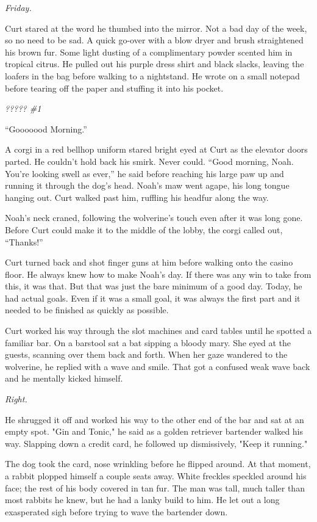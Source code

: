 \emph{Friday.}

Curt stared at the word he thumbed into the mirror. Not a bad day of the week, so no need to be sad. A quick go-over with a blow dryer and brush straightened his brown fur. Some light dusting of a complimentary powder scented him in tropical citrus. He pulled out his purple dress shirt and black slacks, leaving the loafers in the bag before walking to a nightstand. He wrote on a small notepad before tearing off the paper and stuffing it into his pocket.

\emph{????? \#1}

``Gooooood Morning.''

A corgi in a red bellhop uniform stared bright eyed at Curt as the elevator doors parted. He couldn't hold back his smirk. Never could. ``Good morning, Noah. You're looking swell as ever,'' he said before reaching his large paw up and running it through the dog's head. Noah's maw went agape, his long tongue hanging out. Curt walked past him, ruffling his headfur along the way.

Noah's neck craned, following the wolverine's touch even after it was long gone. Before Curt could make it to the middle of the lobby, the corgi called out, ``Thanks!''

Curt turned back and shot finger guns at him before walking onto the casino floor. He always knew how to make Noah's day. If there was any win to take from this, it was that. But that was just the bare minimum of a good day. Today, he had actual goals. Even if it was a small goal, it was always the first part and it needed to be finished as quickly as possible.

Curt worked his way through the slot machines and card tables until he spotted a familiar bar. On a barstool sat a bat sipping a bloody mary. She eyed at the guests, scanning over them back and forth. When her gaze wandered to the wolverine, he replied with a wave and smile. That got a confused weak wave back and he mentally kicked himself.

\emph{Right.}

He shrugged it off and worked his way to the other end of the bar and sat at an empty spot. "Gin and Tonic," he said as a golden retriever bartender walked his way. Slapping down a credit card, he followed up dismissively, "Keep it running."

The dog took the card, nose wrinkling before he flipped around. At that moment, a rabbit plopped himself a couple seats away. White freckles speckled around his face; the rest of his body covered in tan fur. The man was tall, much taller than most rabbits he knew, but he had a lanky build to him. He let out a long exasperated sigh before trying to wave the bartender down.

